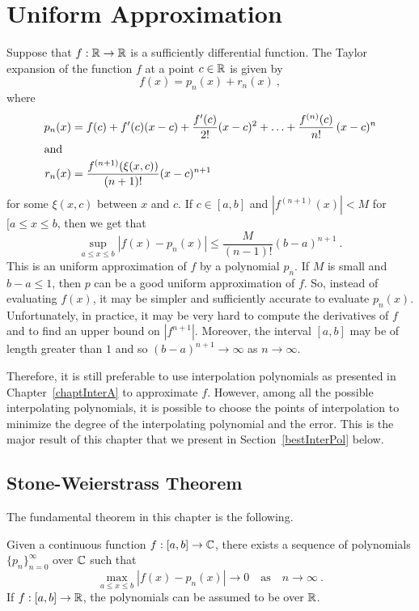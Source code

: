 \chapter{Uniform Approximation} \label{chaptApproxB}

Suppose that $f:\mathbb{R} \to \mathbb{R}$ is a sufficiently differential function.
The Taylor expansion of the function $f$ at a point $c \in \mathbb{R}$ is
given by
\[
  f(x) = p_n(x) + r_n(x) \ ,
\]
where
\begin{align*}
p_n(x) &= f(c) + f'(c)(x-c) + \frac{f'(c)}{2!}(x-c)^2 + \ldots
+ \frac{f^{(n)}(c)}{n!} \, (x-c)^n\\
\intertext{and}
r_n(x) &= \frac{f^{(n+1)}(\xi(x,c))}{(n+1)!}(x-c)^{n+1}
\end{align*}
for some $\xi(x,c)$ between $x$ and $c$.  If $c \in [a,b]$ and
$\displaystyle \left|f^{(n+1)}(x)\right| < M$ for $[a\leq x \leq b$,
then we get that
\[
  \sup_{a\leq x \leq b} |f(x) - p_n(x)| \leq \frac{M}{(n-1)!}(b-a)^{n+1} \ .
\]
This is an uniform approximation of $f$ by a polynomial $p_n$.  If $M$
is small and $b-a \leq 1$, then $p$ can be a good uniform
approximation of $f$.  So, instead of evaluating $f(x)$, it may be
simpler and sufficiently accurate to evaluate $p_n(x)$.
Unfortunately, in practice, it may be very hard to compute the
derivatives of $f$ and to find an upper bound on $|f^{n+1}|$.
Moreover, the interval $[a,b]$ may be of length greater than $1$ and
so $(b-a)^{n+1} \to \infty$ as $n \to \infty$.

Therefore, it is still preferable to use interpolation polynomials
as presented in Chapter~\ref{chaptInterA} to approximate $f$.
However, among all the possible interpolating polynomials, it is
possible to choose the points of interpolation to minimize the degree
of the interpolating polynomial and the error.
This is the major result of this chapter that we present in
Section~\ref{bestInterPol} below.

\section{Stone-Weierstrass Theorem}

The fundamental theorem in this chapter is the following.

\begin{theorem}
Given a continuous function $f:[a,b] \to \mathbb{C}$, there exists a sequence
of polynomials $\{p_n\}_{n=0}^\infty$ over $\mathbb{C}$ such that
\[
  \max_{a\leq x \leq b} |f(x)-p_n(x)| \to 0 \quad \text{as}
  \quad n \to \infty \ .
\]
If $f:[a,b]\to \mathbb{R}$, the polynomials can be assumed to be over $\mathbb{R}$.
\label{SWtheorem}
\end{theorem}

